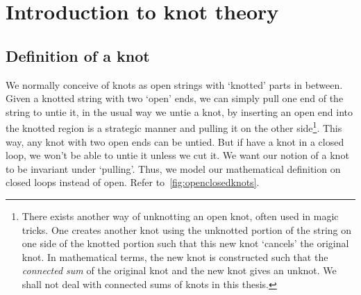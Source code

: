 \chapter{Introduction to knot theory}

\section{Definition of a knot}

We normally conceive of knots as open strings with `knotted' parts in between. Given a knotted string with two `open' ends, we can simply pull one end of the string to untie it, in the usual way we untie a knot, by inserting an open end into the knotted region is a strategic manner and pulling it on the other side\footnote{There exists another way of unknotting an open knot, often used in magic tricks. One creates another knot using the unknotted portion of the string on one side of the knotted portion such that this new knot `cancels' the original knot. In mathematical terms, the new knot is constructed such that the \textit{connected sum} of the original knot and the new knot gives an unknot. We shall not deal with connected sums of knots in this thesis.}. This way, any knot with two open ends can be untied. But if have a knot in a closed loop, we won't be able to untie it unless we cut it. We want our notion of a knot to be invariant under `pulling'. Thus, we model our mathematical definition on closed loops instead of open. Refer to~\cref{fig:openclosedknots}.

